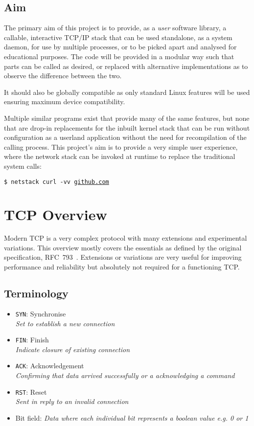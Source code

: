 \documentclass[11pt,a4paper,british]{bhamarticle}
\begin{document}
\begin{multicols}{2}
\subsection{Aim}\label{sec:aim}
The primary aim of this project is to provide, as a \textit{user} software library, a callable, interactive TCP/IP stack that can be used standalone, as a system daemon, for use by multiple processes, or to be picked apart and analysed for educational purposes. The code will be provided in a modular way such that parts can be called as desired, or replaced with alternative implementations as to observe the difference between the two.

It should also be globally compatible as only standard Linux features will be used ensuring maximum device compatibility.

Multiple similar programs exist that provide many of the same features, but none that are drop-in replacements for the inbuilt kernel stack that can be run without configuration as a userland application without the need for recompilation of the calling process. This project's aim is to provide a very simple user experience, where the network stack can be invoked at runtime to replace the traditional system calls:

\begin{center}
    \texttt{\$ netstack curl -vv \url{github.com}}
\end{center}

\section{TCP Overview}
Modern TCP is a very complex protocol with many extensions and experimental variations. This overview mostly covers the essentials as defined by the original specification, RFC~793~\cite{rfc793}. Extensions or variations are very useful for improving performance and reliability but absolutely not required for a functioning TCP. %

\subsection{Terminology}
\begin{itemize}
    \item \texttt{SYN}: Synchronise\\
        \textit{Set to establish a new connection}
    \item \texttt{FIN}: Finish\\
        \textit{Indicate closure of existing connection}
    \item \texttt{ACK}: Acknowledgement\\
        \textit{Confirming that data arrived successfully or a acknowledging a command}
    \item \texttt{RST}: Reset\\
        \textit{Sent in reply to an invalid connection}
    \item Bit field: \textit{Data where each individual bit represents a boolean value e.g. 0 or 1}
\end{itemize}


\end{multicols}
\end{document}
